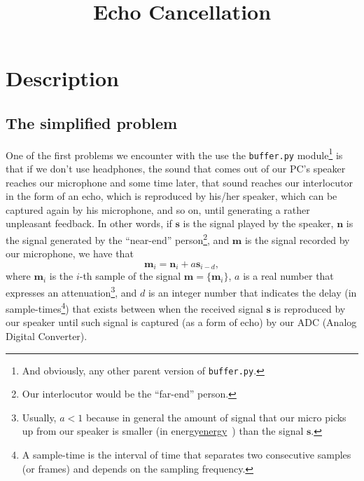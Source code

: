 
\title{Echo Cancellation}

\maketitle

\section{Description}

\subsection{The simplified problem}

One of the first problems we encounter with the use the
\texttt{buffer.py} module\footnote{And obviously, any other parent
  version of \texttt{buffer.py}.} is that if we don't use headphones,
the sound that comes out of our PC's speaker reaches our microphone
and some time later, that sound reaches our interlocutor in the form
of an echo, which is reproduced by his/her speaker, which can be captured
again by his microphone, and so on, until generating a rather
unpleasant feedback. In other words, if ${\mathbf s}$ is the signal
played by the speaker, ${\mathbf n}$ is the signal generated by the
``near-end'' person\footnote{Our interlocutor would be the ``far-end''
  person.}, and ${\mathbf m}$ is the signal recorded by our
microphone, we have that
\begin{equation}
   {\mathbf m}_i = {\mathbf n}_i + a{\mathbf s}_{i-d},
  \label{eq:echo_problem}
\end{equation}
where ${\mathbf m}_i$ is the $i$-th sample of the signal
${\mathbf m} = \{{\mathbf m}_i\}$, $a$ is a real number that expresses
an attenuation\footnote{Usually, $a<1$ because in general the amount
  of signal that our micro picks up from our speaker is smaller (in
  energy\href{https://en.wikipedia.org/wiki/Energy_(signal_processing)}{energy}~\cite{vetterli2014foundations})
  than the signal ${\mathbf s}$.}, and $d$ is an integer number that
indicates the delay (in sample-times\footnote{A sample-time is the
  interval of time that separates two consecutive samples (or frames)
  and depends on the sampling frequency.}) that exists between when
the received signal ${\mathbf s}$ is reproduced by our speaker until
such signal is captured (as a form of echo) by our ADC (Analog Digital
Converter).

